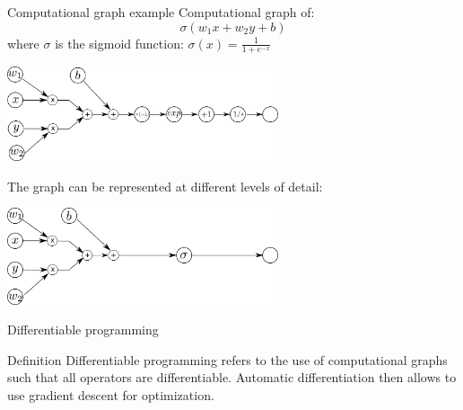 \documentclass[xcolor=pdftex,dvipsnames,table,mathserif]{beamer}
\begin{document}
\begin{frame}{Computational graph example}
  Computational graph of:
  \[
  \sigma(w_1x + w_2y + b)
  \]
  where $\sigma$ is the sigmoid function: $\sigma(x) = \frac{1}{1 + e^{-x}}$

  \pause

  \centering
  \begin{block}{}
    \centering
   \includegraphics[width=0.6\textwidth]{comp_graph2}\\
   \end{block}

  \pause

  The graph can be represented at different levels of detail:
 \begin{block}{}
    \centering
  \includegraphics[width=0.6\textwidth]{comp_graph}
   \end{block}

\end{frame}

\begin{frame}{Differentiable programming}

  \begin{block}{Definition}
    Differentiable programming refers to the use of computational graphs such that all operators are differentiable. Automatic differentiation then allows to use gradient descent for optimization.
  \end{block}

\end{frame}


\end{document}
